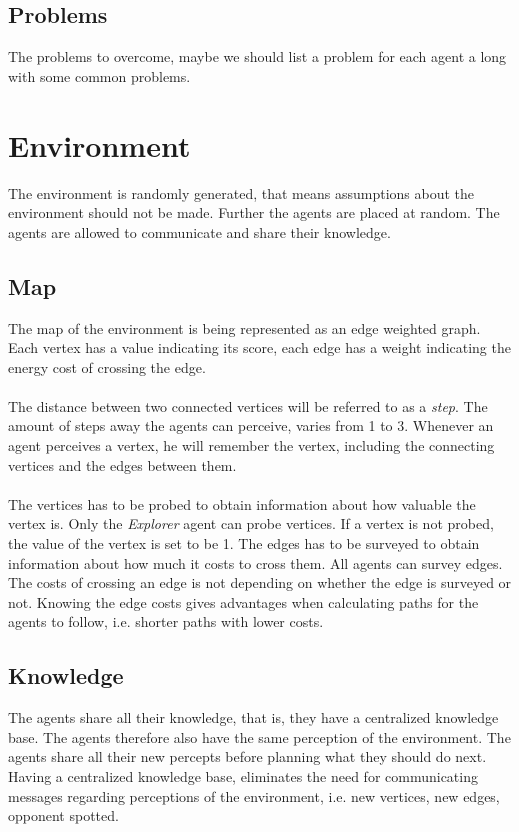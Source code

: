 \documentclass[11pt]{article}
\begin{document}
\subsection{Problems}
The problems to overcome, maybe we should list a problem for each agent a long with some common problems.

\section{Environment}
The environment is randomly generated, that means assumptions about the environment should not be made. Further the agents are placed at random. The agents are allowed to communicate and share their knowledge.

\subsection{Map}
The map of the environment is being represented as an edge weighted graph. Each vertex has a value indicating its score, each edge has a weight indicating the energy cost of crossing the edge.\\
\\
The distance between two connected vertices will be referred to as a \emph{step}. The amount of steps away the agents can perceive, varies from 1 to 3. Whenever an agent perceives a vertex, he will remember the vertex, including the connecting vertices and the edges between them.\\
\\
The vertices has to be probed to obtain information about how valuable the vertex is. Only the \emph{Explorer} agent can probe vertices. If a vertex is not probed, the value of the vertex is set to be 1. The edges has to be surveyed to obtain information about how much it costs to cross them. All agents can survey edges. The costs of crossing an edge is not depending on whether the edge is surveyed or not. Knowing the edge costs gives advantages when calculating paths for the agents to follow, i.e. shorter paths with lower costs.

\subsection{Knowledge}
The agents share all their knowledge, that is, they have a centralized knowledge base. The agents therefore also have the same perception of the environment. The agents share all their new percepts before planning what they should do next. Having a centralized knowledge base, eliminates the need for communicating messages regarding perceptions of the environment, i.e. new vertices, new edges, opponent spotted.
\end{document}

